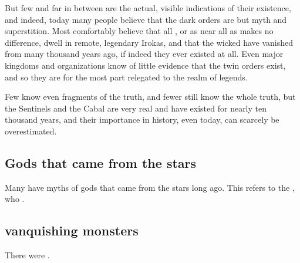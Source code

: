 But few and far in between are the actual, visible indications of their existence, and indeed, today many people believe that the dark orders are but myth and superstition. Most \Velcadians{} comfortably believe that all \dragons{}, or as near all as makes no difference, dwell in remote, legendary Irokas, and that the wicked \banes{} have vanished from \Miith{} many thousand years ago, if indeed they ever existed at all. Even major kingdoms and organizations know of little evidence that the twin orders exist, and so they are for the most part relegated to the realm of legends. 

Few know even fragments of the truth, and fewer still know the whole truth, but the Sentinels and the Cabal are very real and have existed for nearly ten thousand years, and their importance in \Miithian{} history, even today, can scarcely be overestimated. 









\subsection{Gods that came from the stars}
Many \humans{} have myths of gods that came from the stars long ago. This refers to the \resphain{}, who .










\subsection{\Humans vanquishing monsters}
There were . 









